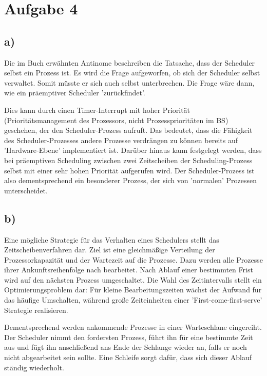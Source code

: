 \documentclass[11pt,a4paper,DIV=10,]{scrartcl}
\begin{document}
\section*{Aufgabe 4}
\subsection*{a)}
Die im Buch erwähnten Antinome beschreiben die Tatsache, dass der Scheduler selbst ein Prozess ist. Es wird die Frage aufgeworfen, ob sich der Scheduler selbst verwaltet. Somit müsste er sich auch selbst unterbrechen. Die Frage wäre dann, wie ein präemptiver Scheduler 'zurückfindet'.

Dies kann durch einen Timer-Interrupt mit hoher Priorität (Prioritätsmanagement des Prozessors, nicht Prozessprioritäten im BS) geschehen, der den Scheduler-Prozess aufruft. Das bedeutet, dass die Fähigkeit des Scheduler-Prozesses andere Prozesse verdrängen zu können bereits auf 'Hardware-Ebene' implementiert ist. Darüber hinaus kann festgelegt werden, dass bei präemptiven Scheduling zwischen zwei Zeitscheiben der Scheduling-Prozess selbst mit einer sehr hohen Priorität aufgerufen wird. Der Scheduler-Prozess ist also dementsprechend ein besonderer Prozess, der sich von 'normalen' Pro\-zess\-en unterscheidet. 
\subsection*{b)} 
Eine mögliche Strategie für das Verhalten eines Schedulers stellt das Zeitscheibenverfahren dar. Ziel ist eine gleichmäßige Verteilung der Prozessorkapazität und der Wartezeit auf die Prozesse. Dazu werden alle Prozesse ihrer Ankunftsreihenfolge nach bearbeitet. Nach Ablauf 
einer bestimmten Frist wird auf den nächsten Prozess umgeschaltet. Die Wahl des Zeitintervalls stellt ein Optimierungsproblem dar: Für kleine 
Bearbeitungszeiten wächst der Aufwand fur das häufige Umschalten, während große Zeiteinheiten einer 'First-come-first-serve' Strategie realisieren.

Dementsprechend werden ankommende Prozesse in einer Warteschlane eingereiht. Der Scheduler nimmt den fordersten Prozess, führt ihn für eine bestimmte Zeit aus und fügt ihn anschließend ans Ende der Schlange wieder an, falls er noch nicht abgearbeitet sein sollte. Eine Schleife sorgt dafür, dass sich dieser Ablauf ständig wiederholt.
\end{document}
